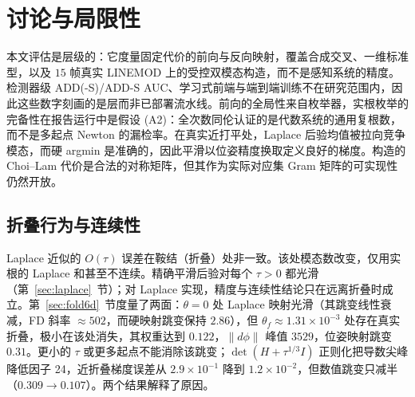 \section{讨论与局限性}\label{sec:discussion}

本文评估是层级的：它度量固定代价的前向与反向映射，覆盖合成交叉、一维标准型，以及 $15$ 帧真实 LINEMOD 上的受控双模态构造，而不是感知系统的精度。检测器级 ADD(-S)/ADD-S AUC、学习式前端与端到端训练不在研究范围内，因此这些数字刻画的是层而非已部署流水线。前向的全局性来自枚举器，实根枚举的完备性在报告运行中是假设 (A2)：全次数同伦认证的是代数系统的通用复根数，而不是多起点 Newton 的漏检率。在真实近打平处，Laplace 后验均值被拉向竞争模态，而硬 argmin 是准确的，因此平滑以位姿精度换取定义良好的梯度。构造的 Choi--Lam 代价是合法的对称矩阵，但其作为实际对应集 Gram 矩阵的可实现性仍然开放。

\subsection{折叠行为与连续性}

Laplace 近似的 $O(\tau)$ 误差在鞍结（折叠）处非一致。该处模态数改变，仅用实根的 Laplace 和甚至不连续。精确平滑后验对每个 $\tau>0$ 都光滑（第~\ref{sec:laplace}~节）；对 Laplace 实现，精度与连续性结论只在远离折叠时成立。第~\ref{sec:fold6d}~节度量了两面：$\theta=0$ 处 Laplace 映射光滑（其跳变线性衰减，FD 斜率 $\approx502$，而硬映射跳变保持 $2.86$），但 $\theta_f\approx1.31\times10^{-3}$ 处存在真实折叠，极小在该处消失，其权重达到 $0.122$，$\|d\phi\|$ 峰值 $3529$，位姿映射跳变 $0.31$。更小的 $\tau$ 或更多起点不能消除该跳变；$\det(H+\tau^{1/3}I)$ 正则化把导数尖峰降低因子 24，近折叠梯度误差从 $2.9\times10^{-1}$ 降到 $1.2\times10^{-2}$，但数值跳变只减半（$0.309\to0.107$）。两个结果解释了原因。


